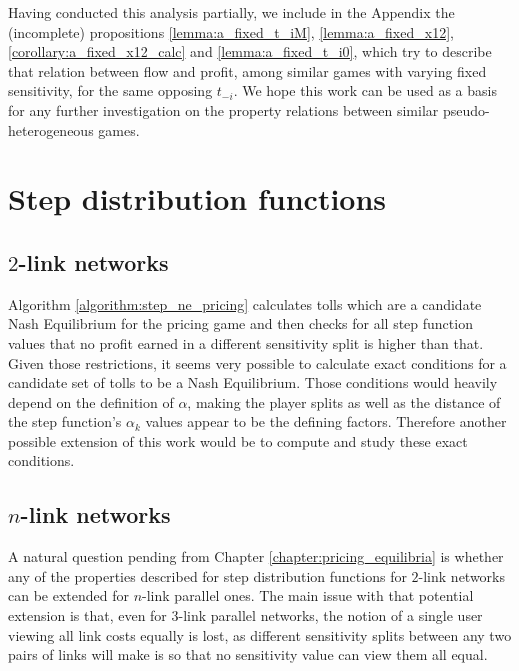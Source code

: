 \documentclass[10pt,a4paper]{book}
\theoremstyle{definition}
\theoremstyle{comment}
\begin{document}
Having conducted this analysis partially, we include in the Appendix the (incomplete) propositions \ref{lemma:a_fixed_t_iM}, \ref{lemma:a_fixed_x12}, \ref{corollary:a_fixed_x12_calc} and \ref{lemma:a_fixed_t_i0}, which try to describe that relation between flow and profit, among similar games with varying fixed sensitivity, for the same opposing $t_{-i}$.
We hope this work can be used as a basis for any further investigation on the property relations between similar pseudo-heterogeneous games.

\section*{Step distribution functions}

\subsection*{$2$-link networks}

Algorithm \ref{algorithm:step_ne_pricing} calculates tolls which are a candidate Nash Equilibrium for the pricing game and then checks for all step function values that no profit earned in a different sensitivity split is higher than that.
Given those restrictions, it seems very possible to calculate exact conditions for a candidate set of tolls to be a Nash Equilibrium.
Those conditions would heavily depend on the definition of $\alpha$, making the player splits as well as the distance of the step function's $\alpha_k$ values appear to be the defining factors.
Therefore another possible extension of this work would be to compute and study these exact conditions.

\subsection*{$n$-link networks}

A natural question pending from Chapter \ref{chapter:pricing_equilibria} is whether any of the properties described for step distribution functions for $2$-link networks can be extended for $n$-link parallel ones.
The main issue with that potential extension is that, even for $3$-link parallel networks, the notion of a single user viewing all link costs equally is lost, as different sensitivity splits between any two pairs of links will make is so that no sensitivity value can view them all equal.
\end{document}
